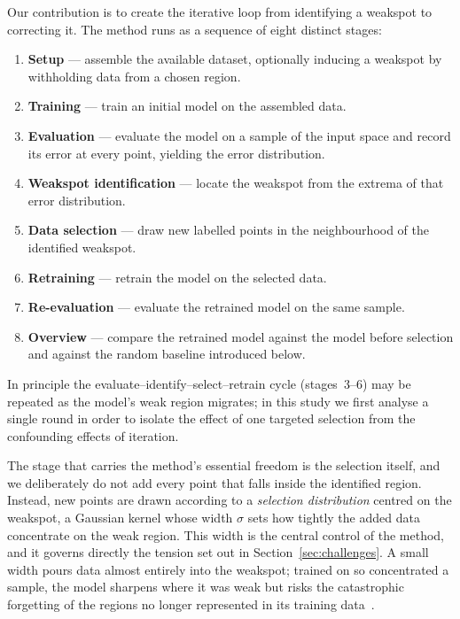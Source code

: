 \documentclass[conference]{IEEEtran}
\begin{document}
Our contribution is to create the iterative loop from identifying a weakspot to
correcting it. The method runs as a sequence of eight distinct stages:
\begin{enumerate}
  \item \textbf{Setup} --- assemble the available dataset, optionally inducing a
    weakspot by withholding data from a chosen region.
  \item \textbf{Training} --- train an initial model on the assembled data.
  \item \textbf{Evaluation} --- evaluate the model on a sample of the input space
    and record its error at every point, yielding the error distribution.
  \item \textbf{Weakspot identification} --- locate the weakspot from the extrema
    of that error distribution.
  \item \textbf{Data selection} --- draw new labelled points in the neighbourhood
    of the identified weakspot.
  \item \textbf{Retraining} --- retrain the model on the selected data.
  \item \textbf{Re-evaluation} --- evaluate the retrained model on the same
    sample.
  \item \textbf{Overview} --- compare the retrained model against the model before
    selection and against the random baseline introduced below.
\end{enumerate}
In principle the evaluate--identify--select--retrain cycle (stages~3--6) may be
repeated as the model's weak region migrates; in this study we first analyse a single
round in order to isolate the effect of one targeted selection from the
confounding effects of iteration.

The stage that carries the method's essential freedom is the selection itself, and
we deliberately do not add every point that falls inside the identified region.
Instead, new points are drawn according to a \emph{selection distribution} centred
on the weakspot, a Gaussian kernel whose width $\sigma$ sets how tightly the added
data concentrate on the weak region. This width is the central control of the
method, and it governs directly the tension set out in
Section~\ref{sec:challenges}. A small width pours data almost entirely into the
weakspot; trained on so concentrated a sample, the model sharpens where it was
weak but risks the catastrophic forgetting of the regions no longer represented in
its training data~\cite{mccloskey1989,kirkpatrick2017}.
\end{document}
